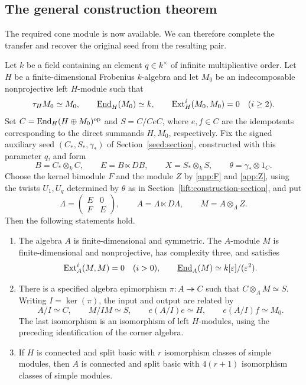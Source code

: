 \documentclass[11pt]{article}
\begin{document}
\subsection{The general construction theorem}

The required cone module is now available. We can therefore complete
the transfer and recover the original seed from the resulting pair.

\begin{Theo}
\label{general:construction}
Let $k$ be a field containing an element $q\in k^\times$ of infinite
multiplicative order. Let $H$ be a finite-dimensional Frobenius
$k$-algebra and let
$M_0$ be an indecomposable nonprojective left
$H$-module such that
\begin{equation*}
 \tau_HM_0\simeq M_0,\qquad
 \underline{{\rm End}}_H(M_0)\simeq k,\qquad
 {\rm Ext}_H^i(M_0,M_0)=0\quad(i\ge2).
\end{equation*}
Set $C={\rm End}_H(H\oplus M_0)^{\mathrm{op}}$ and $S=C/CeC$, where $e,f\in C$ are the idempotents corresponding to the direct summands $H, M_0$, respectively.
Fix the signed auxiliary seed $(C_*,S_*,\gamma_*)$ of Section~\ref{seed:section},
constructed with this parameter $q$, and
form
\[
 B=C_*\otimes_k C,\qquad E=B\ltimes DB,\qquad
 X=S_*\otimes_k S,\qquad \theta=\gamma_*\otimes1_C.
\]
Choose the kernel bimodule $F$ and the module $Z$ by
\eqref{app:F} and \eqref{app:Z}, using the twists $U_1,U_q$
determined by $\theta$ as in Section~\ref{lift:construction-section}, and put
\begin{equation*}
 \Lambda=\begin{pmatrix}E&0\\F&E\end{pmatrix},\qquad
 A=\Lambda\ltimes D\Lambda,\qquad M=A\otimes_\Lambda Z.
\end{equation*}
Then the following statements hold.
\begin{enumerate}
\item\label{general:construction-module} The algebra $A$ is finite-dimensional and symmetric. The
$A$-module $M$ is finite-dimensional and nonprojective, has complexity
three, and satisfies
\[
 {\rm Ext}_A^i(M,M)=0\quad(i>0),\qquad
 \underline{{\rm End}}_A(M)\simeq k[\varepsilon]/(\varepsilon^2).
\]
\item\label{general:construction-recovery} There is a specified algebra epimorphism $\pi:A\twoheadrightarrow C$
such that $C\otimes_A M\simeq S$.
Writing $I=\ker(\pi)$, the input and output are related by
\begin{equation*}
 A/I\simeq C,\qquad M/IM\simeq S,\qquad
 e(A/I)e\simeq H,\qquad e(A/I)f\simeq M_0.
\end{equation*}
The last isomorphism is an isomorphism of left $H$-modules, using the
preceding identification of the corner algebra.
\item\label{general:construction-basic} If $H$ is connected and split basic with $r$ isomorphism classes
of simple modules, then $A$ is connected and split basic with
$4(r+1)$ isomorphism classes of simple modules.
\end{enumerate}
\end{Theo}
\end{document}
